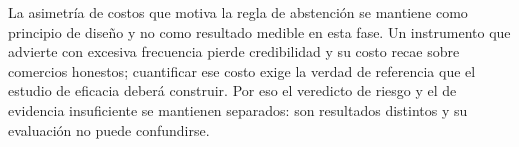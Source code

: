 La asimetría de costos que motiva la regla de abstención se mantiene como
principio de diseño y no como resultado medible en esta fase. Un instrumento que advierte con
excesiva frecuencia pierde credibilidad y su costo recae sobre comercios honestos; cuantificar
ese costo exige la verdad de referencia que el estudio de eficacia deberá construir. Por eso
el veredicto de riesgo y el de evidencia insuficiente se mantienen separados: son resultados
distintos y su evaluación no puede confundirse.

